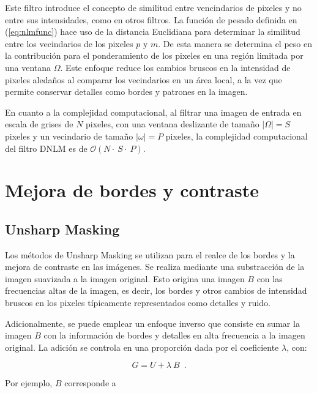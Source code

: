 Este filtro introduce el concepto de similitud entre vencindarios de pixeles y no entre sus intensidades, como en otros filtros. La funci\'on de pesado definida en (\ref{eq:nlmfunc}) hace uso de la distancia Euclidiana para determinar la similitud entre los vecindarios de los pixeles $p$ y $m$. 
De esta manera se determina el peso en la contribuci\'on para el ponderamiento de los pixeles en una regi\'on limitada por una ventana $\Omega$. Este enfoque reduce los cambios bruscos en la intensidad de pixeles aleda\~nos al comparar los vecindarios en un \'area local, a la vez que permite conservar detalles como bordes y patrones en la imagen\cite{calderon2015dewaff}. 


En cuanto a la complejidad computacional, al filtrar una imagen de entrada en escala de grises de $N$ pixeles, con una ventana deslizante de tama\~no $|\Omega| = S$ pixeles y un vecindario de tama\~no $|\omega| = P$ pixeles, la complejidad computacional del filtro DNLM es de $\mathcal{O}(N\cdot~S\cdot~P)$. 



\section{Mejora de bordes y contraste}

\subsection{Unsharp Masking}
\label{ch:marco_usm}

Los m\'etodos de Unsharp Masking se utilizan para el realce de los bordes y la mejora de contraste en las im\'agenes. Se realiza mediante una substracci\'on de la imagen suavizada a la imagen original. Esto origina una imagen $B$ con las frecuencias altas de la imagen, es decir, los bordes y otros cambios de intensidad bruscos en los pixeles t\'ipicamente representados como detalles y ruido. 

Adicionalmente, se puede emplear un enfoque inverso que consiste en sumar la imagen $B$ con la informaci\'on de bordes y detalles en alta frecuencia a la imagen original. La adici\'on se controla en una proporci\'on dada por el coeficiente $\lambda$, con:

\begin{equation}
\label{eq:unsharpmask}
G=U+\lambda~B \enspace .
\end{equation}

Por ejemplo, $B$ corresponde a

